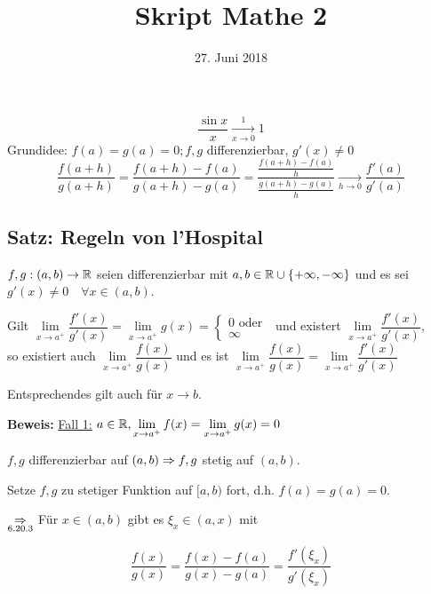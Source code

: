 \documentclass[10pt, a4paper, fleqn]{article}
\begin{document}
    \title{Skript Mathe 2}
    \date{27. Juni 2018}
    \maketitle
\fi
\[
    \frac{\sin x}{x} \xrightarrow[x \to 0]{1} 1
\]
Grundidee: $f(a) = g(a) = 0; f,g$ differenzierbar, $g'(x) \neq 0$
\[
    \frac{f(a + h)}{g(a + h)} = \frac{f(a + h) - f(a)}{g(a + h) - g(a)} = 
    \frac{\frac{f(a + h) - f(a)}{h}}{\frac{g(a + h) - g(a)}{h}} \xrightarrow[h \to 0]{} \frac{f'(a)}{g'(a)}
\]
\subsection{Satz: Regeln von l'Hospital}
$f, g: (a, b) \to \mathbb{R}$ seien differenzierbar mit $a, b \in \mathbb{R} \cup \{+\infty, -\infty\}$
und es sei $g'(x) \neq 0 \quad \forall x \in (a, b)$.

Gilt $\lim\limits_{x \to a^+} \dfrac{f'(x)}{g'(x)} = \lim\limits_{x \to a^+} g(x) = \begin{cases}
    0 \text{ oder } \\ \infty
\end{cases}$ und existert $\lim\limits_{x \to a^+} \dfrac{f'(x)}{g'(x)}$, \\
so existiert auch $\lim\limits_{x \to a^+} \dfrac{f(x)}{g(x)}$ und es ist 
$\lim\limits_{x \to a^+} \dfrac{f(x)}{g(x)} = \lim\limits_{x \to a^+} \dfrac{f'(x)}{g'(x)}$

Entsprechendes gilt auch für $x \to b$.
\bigskip

\textbf{Beweis: } \underline{Fall 1:} $a \in \mathbb{R}, \lim\limits_{x \to a^+} f(x) = \lim\limits_{x \to a^+} g(x) = 0$

$f, g$ differenzierbar auf $(a, b) \Rightarrow f, g$ stetig auf $(a, b)$.

Setze $f, g$ zu stetiger Funktion auf $[a, b)$ fort, d.h. $f(a) = g(a) = 0$.

$\underset{6.20.3}{\Rightarrow}$ Für $x \in (a, b)$ gibt es $\xi_x \in (a, x)$ mit \\
\begin{minipage}{0.5\textwidth}
    \[
        \frac{f(x)}{g(x)} = \frac{f(x) - f(a)}{g(x) - g(a)} = \frac{f'(\xi_x)}{g'(\xi_x)}
    \]
\end{minipage}
\begin{minipage}{0.5\textwidth}
    \vspace{25pt}
\end{minipage}
\end{document}

